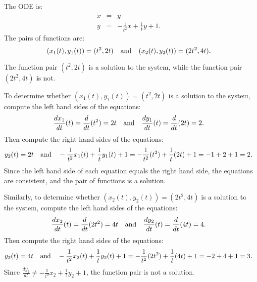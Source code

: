 \documentclass{ximera}
\begin{document}
\begin{computerExercise} \label{c3.5.5d}
The ODE is:
\begin{eqnarray*}
\dot{x} & = & y  \\
\dot{y} & = &  -\frac{1}{t^2}x + \frac{1}{t}y + 1.
\end{eqnarray*}
The pairs of functions are:
\[
(x_1(t),y_1(t)) = (t^2,2t)  \quad\mbox{and}\quad (x_2(t),y_2(t)) = (2t^2,4t).
\]

\begin{solution}
\ans The function pair $(t^2,2t)$ is a solution to
the system, while the function pair $(2t^2,4t)$ is not.

\soln To determine whether $(x_1(t),y_1(t)) = (t^2,2t)$ is
a solution to the system, compute the left hand sides of the equations:
\[
\frac{dx_1}{dt}(t) = \frac{d}{dt}(t^2) = 2t \quad\mbox{and}\quad
\frac{dy_1}{dt}(t) = \frac{d}{dt}(2t) = 2.
\]
Then compute the right hand sides of the equations:
\[
y_2(t) = 2t \quad\mbox{and}\quad
-\frac{1}{t^2}x_1(t) + \frac{1}{t}y_1(t) + 1 =
-\frac{1}{t^2}(t^2) + \frac{1}{t}(2t) + 1 = -1 + 2 + 1 = 2.
\]
Since the left hand side of each equation equals the right hand side, the
equations are consistent, and the pair of functions is a solution.

\para Similarly, to determine whether $(x_2(t),y_2(t)) = (2t^2,4t)$ is a
solution to the system, compute the left hand sides of the equations:
\[
\frac{dx_2}{dt}(t) = \frac{d}{dt}(2t^2) = 4t \quad\mbox{and}\quad
\frac{dy_2}{dt}(t) = \frac{d}{dt}(4t) = 4.
\]
Then compute the right hand sides of the equations:
\[
y_2(t) = 4t \quad\mbox{and}\quad
-\frac{1}{t^2}x_2(t) + \frac{1}{t}y_2(t) + 1 =
-\frac{1}{t^2}(2t^2) + \frac{1}{t}(4t) + 1 = -2 + 4 + 1 = 3.
\]
Since $\frac{dy_2}{dt} \neq -\frac{1}{t^2}x_2 + \frac{1}{t}y_2 + 1$,
the function pair is not a solution.





\end{solution}
\end{computerExercise}
\end{document}
